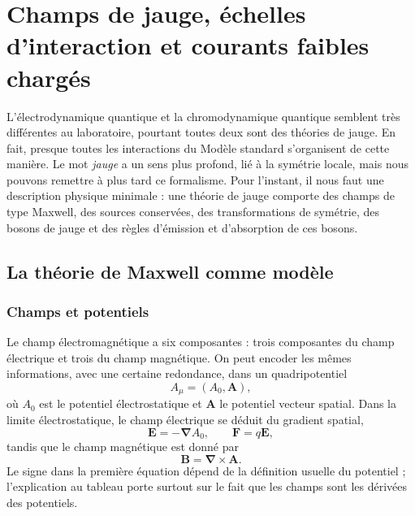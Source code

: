 \chapter{Champs de jauge, échelles d’interaction et courants faibles chargés}

L’électrodynamique quantique et la chromodynamique quantique semblent très différentes au laboratoire, pourtant toutes deux sont des théories de jauge. En fait, presque toutes les interactions du Modèle standard s’organisent de cette manière. Le mot \emph{jauge} a un sens plus profond, lié à la symétrie locale, mais nous pouvons remettre à plus tard ce formalisme. Pour l’instant, il nous faut une description physique minimale : une théorie de jauge comporte des champs de type Maxwell, des sources conservées, des transformations de symétrie, des bosons de jauge et des règles d’émission et d’absorption de ces bosons.

\section{La théorie de Maxwell comme modèle}

\subsection{Champs et potentiels}

Le champ électromagnétique a six composantes : trois composantes du champ électrique et trois du champ magnétique. On peut encoder les mêmes informations, avec une certaine redondance, dans un quadripotentiel
\begin{equation}
A_\mu=(A_0,\boldsymbol A),
\end{equation}
où \(A_0\) est le potentiel électrostatique et \(\boldsymbol A\) le potentiel vecteur spatial. Dans la limite électrostatique, le champ électrique se déduit du gradient spatial,
\begin{equation}
\boldsymbol E=-\boldsymbol\nabla A_0,
\qquad
\boldsymbol F=q\boldsymbol E,
\end{equation}
tandis que le champ magnétique est donné par
\begin{equation}
\boldsymbol B=\boldsymbol\nabla\times\boldsymbol A.
\end{equation}
Le signe dans la première équation dépend de la définition usuelle du potentiel ; l’explication au tableau porte surtout sur le fait que les champs sont les dérivées des potentiels.

